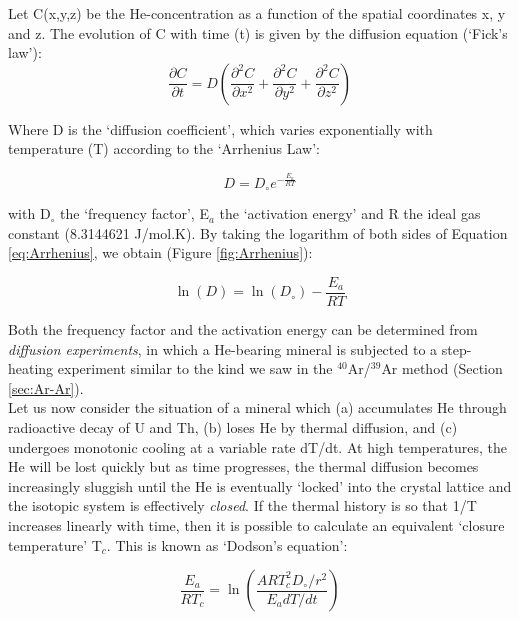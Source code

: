 Let C(x,y,z) be the He-concentration as a function of the spatial
coordinates x, y and z.  The evolution of C with time (t) is given by
the diffusion equation (`Fick's law'):
\begin{equation}
\frac{\partial C}{\partial t} = D \left(
\frac{\partial^2C}{\partial x^2} + \frac{\partial^2C}{\partial y^2} +
\frac{\partial^2C}{\partial z^2}\right)
\label{eq:fick}
\end{equation}

Where D is the `diffusion coefficient', which varies exponentially
with temperature (T) according to the `Arrhenius Law':

\begin{equation}
D = D_\circ e^{-\frac{E_a}{RT}}
\label{eq:Arrhenius}
\end{equation}

with D$_\circ$ the `frequency factor', E$_a$ the `activation energy'
and R the ideal gas constant (8.3144621 J/mol.K). By taking the
logarithm of both sides of Equation \ref{eq:Arrhenius}, we obtain
(Figure \ref{fig:Arrhenius}):

\begin{equation}
\ln(D) = \ln(D_\circ) - \frac{E_a}{RT}
\label{eq:logD}
\end{equation}

Both the frequency factor and the activation energy can be determined
from \emph{diffusion experiments}, in which a He-bearing mineral is
subjected to a step-heating experiment similar to the kind we saw in
the $^{40}$Ar/$^{39}$Ar method (Section \ref{sec:Ar-Ar}).\\

Let us now consider the situation of a mineral which (a) accumulates
He through radioactive decay of U and Th, (b) loses He by thermal
diffusion, and (c) undergoes monotonic cooling at a variable rate
dT/dt. At high temperatures, the He will be lost quickly but as time
progresses, the thermal diffusion becomes increasingly sluggish until
the He is eventually `locked' into the crystal lattice and the isotopic
system is effectively \emph{closed}. If the thermal history is so that
1/T increases linearly with time, then it is possible to calculate an
equivalent `closure temperature' T$_c$. This is known as `Dodson's
equation':

\begin{equation}
\frac{E_a}{RT_c} = \ln\left(\frac{ART_c^2D_\circ/r^2}{E_adT/dt}\right)
\label{eq:Tc}
\end{equation}

